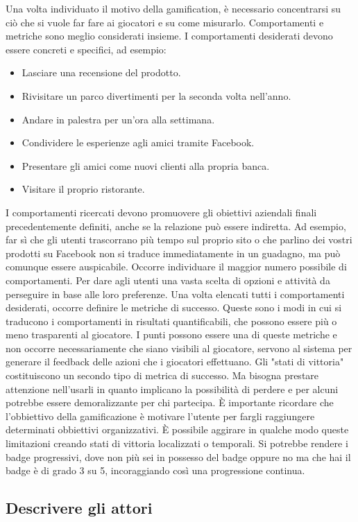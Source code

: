 \begin{itemize}
Una volta individuato il motivo della gamification, è necessario concentrarsi su ciò che si vuole far fare ai giocatori e su come misurarlo. Comportamenti e metriche sono meglio considerati insieme. I comportamenti desiderati devono essere concreti e specifici, ad esempio:
\begin{itemize}
\item Lasciare una recensione del prodotto.
\item Rivisitare un parco divertimenti per la seconda volta nell'anno.
\item Andare in palestra per un'ora alla settimana.
\item Condividere le esperienze agli amici tramite Facebook.
\item Presentare gli amici come nuovi clienti alla propria banca.
\item Visitare il proprio ristorante.
\end{itemize}
I comportamenti ricercati devono promuovere gli obiettivi aziendali finali precedentemente definiti, anche se la relazione può essere indiretta. Ad esempio, far sì che gli utenti trascorrano più tempo sul proprio sito o che parlino dei vostri prodotti su Facebook non si traduce immediatamente in un guadagno, ma può comunque essere auspicabile. Occorre individuare il maggior numero possibile di comportamenti. Per dare agli utenti una vasta scelta di opzioni e attività da perseguire in base alle loro preferenze.
Una volta elencati tutti i comportamenti desiderati, occorre definire le metriche di successo. Queste sono i modi in cui si traducono i comportamenti in risultati quantificabili, che possono essere più o meno trasparenti al giocatore. I punti possono essere una di queste metriche e non occorre necessariamente che siano visibili al giocatore, servono al sistema per generare il feedback delle azioni che i giocatori effettuano.
Gli "stati di vittoria" costituiscono un secondo tipo di metrica di successo. Ma bisogna prestare attenzione nell'usarli in quanto implicano la possibilità di perdere e per alcuni potrebbe essere demoralizzante per chi partecipa. È importante ricordare che l'obbiettivo della gamificazione è motivare l'utente per fargli raggiungere determinati obbiettivi organizzativi. È possibile aggirare in qualche modo queste limitazioni creando stati di vittoria localizzati o temporali.
Si potrebbe rendere i badge progressivi, dove non più sei in possesso del badge oppure no ma che hai il badge è di grado 3 su 5, incoraggiando così una progressione continua.

\subsection{Descrivere gli attori}


\end{itemize}
